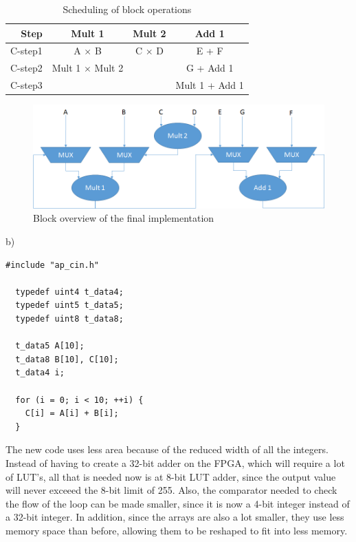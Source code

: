 \documentclass[11pt]{article}
\begin{document}
\begin{table}[h!]
  \centering
  \begin{tabular}{| r | c c c |}
    \hline
    Step & Mult 1 & Mult 2 & Add 1 \\
    \hline
    C-step1 & A $\times$ B & C $\times$ D & E + F \\
    C-step2 & Mult 1 $\times$ Mult 2 & & G + Add 1 \\
    C-step3 & & & Mult 1 + Add 1 \\
    \hline
  \end{tabular}
  \caption{Scheduling of block operations}
  \label{tab:q3_schedule}
\end{table}

\begin{figure}[h!]
  \centering
  \includegraphics[width=\linewidth]{q3/q3_diagram.png}
  \caption{Block overview of the final implementation}
  \label{fig:q3_hw}
\end{figure}

\clearpage

b)
\begin{lstlisting}[showstringspaces=false]
  #include "ap_cin.h"

  typedef uint4 t_data4;
  typedef uint5 t_data5;
  typedef uint8 t_data8;

  t_data5 A[10];
  t_data8 B[10], C[10];
  t_data4 i;

  for (i = 0; i < 10; ++i) {
    C[i] = A[i] + B[i];
  }
\end{lstlisting}

The new code uses less area because of the reduced width of all the integers. Instead of having to create a 32-bit adder on the FPGA, which will require a lot of LUT's, all that is needed now is at 8-bit LUT adder, since the output value will never exceeed the 8-bit limit of 255. Also, the comparator needed to check the flow of the loop can be made smaller, since it is now a 4-bit integer instead of a 32-bit integer. In addition, since the arrays are also a lot smaller, they use less memory space than before, allowing them to be reshaped to fit into less memory.
\end{document}
